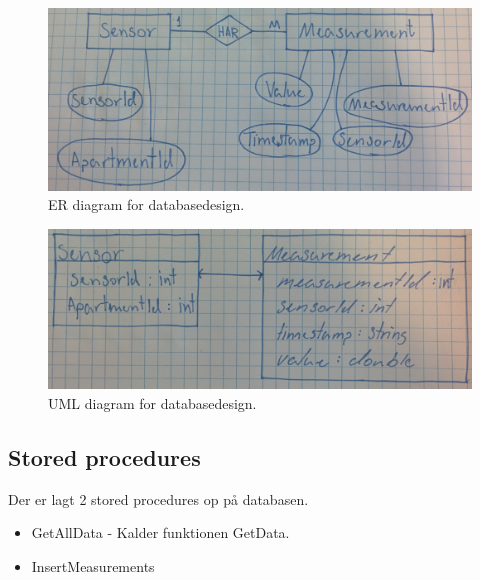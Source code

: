 \begin{figure}[h]
	\centering
	\includegraphics[width=0.8\linewidth]{figs/erdiagram}
	\caption{ER diagram for databasedesign.}
	\label{fig:erdiagram}
\end{figure}

\begin{figure}[h]
	\centering
	\includegraphics[width=0.8\linewidth]{figs/umldiagram}
	\caption{UML diagram for databasedesign.}
	\label{fig:umldiagram}
\end{figure}

\subsection{Stored procedures}
Der er lagt 2 stored procedures op på databasen.

\begin{itemize}
	\item GetAllData - Kalder funktionen GetData.
	\item InsertMeasurements
\end{itemize}
